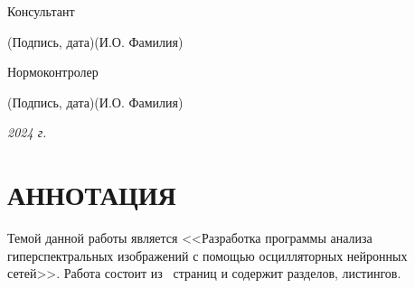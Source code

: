 \documentclass[14pt, russian]{scrartcl}
\begin{document}
\begin{titlepage}
\noindent Консультант \hfill \underline{\hspace{4cm}}\quad
\underline{\hspace{4cm}}

\vspace{-2ex}
\noindent\hspace{13.5ex}\normalsize\hspace{170pt}\hspace{2ex}\scriptsize{(Подпись, дата)}\normalsize\hspace{30pt}\hspace{6ex}\scriptsize{(И.О. Фамилия)}\normalsize

\bigskip

\noindent Нормоконтролер \hfill \underline{\hspace{4cm}}\quad
\underline{\hspace{4cm}}

\vspace{-2ex}
\noindent\hspace{13.5ex}\normalsize\hspace{170pt}\hspace{2ex}\scriptsize{(Подпись, дата)}\normalsize\hspace{30pt}\hspace{6ex}\scriptsize{(И.О. Фамилия)}\normalsize
\vfill

 


\begin{center}
\textsl{2024 г.}
\end{center}
\end{titlepage}


\setlength{\tabcolsep}{3pt}
\newpage
\setcounter{page}{2}


\section*{АННОТАЦИЯ}

Темой данной работы является <<Разработка программы анализа гиперспектральных изображений с помощью осцилляторных нейронных сетей>>. 
Работа состоит из~\pageref{TotPages} страниц и содержит \totalsections{} разделов, \totallistings{} листингов.
\end{document}
